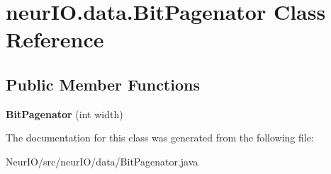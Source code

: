 \hypertarget{classneur_i_o_1_1data_1_1_bit_pagenator}{}\section{neur\+I\+O.\+data.\+Bit\+Pagenator Class Reference}
\label{classneur_i_o_1_1data_1_1_bit_pagenator}
\subsection*{Public Member Functions}
\begin{DoxyCompactItemize}
\item 
\mbox{\label{classneur_i_o_1_1data_1_1_bit_pagenator_a83d98001fc92aebbf5cd7d230c70ba57}} 
{\bfseries Bit\+Pagenator} (int width)
\end{DoxyCompactItemize}


The documentation for this class was generated from the following file\+:\begin{DoxyCompactItemize}
\item 
Neur\+I\+O/src/neur\+I\+O/data/Bit\+Pagenator.\+java\end{DoxyCompactItemize}
